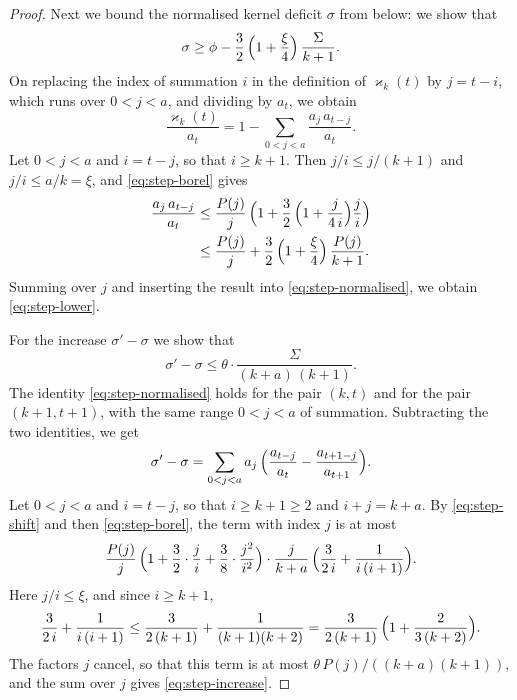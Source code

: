 \documentclass{amsart}
\theoremstyle{definition}
\theoremstyle{remark}
\numberwithin{equation}{section}
\begin{document}
\begin{proof}
Next we bound the normalised kernel deficit $\sigma$ from below: we show
that
\begin{equation}\label{eq:step-lower}
\sigma\ge\phi-\frac32\,\Bigl(1+\frac{\xi}{4}\Bigr)\,\frac{\Sigma}{k+1}.
\end{equation}
On replacing the index of summation $i$ in the definition of
$\varkappa_k(t)$ by $j=t-i$, which runs over $0<j<a$, and dividing by
$a_t$, we obtain
\begin{equation}\label{eq:step-normalised}
\frac{\varkappa_k(t)}{a_t}=1-\sum_{0<j<a}\frac{a_j\,a_{t-j}}{a_t}.
\end{equation}
Let $0<j<a$ and $i=t-j$, so that $i\ge k+1$. Then $j/i\le j/(k+1)$ and
$j/i\le a/k=\xi$, and \eqref{eq:step-borel} gives
\begin{align*}
\frac{a_j\,a_{t-j}}{a_t}
&\le\frac{P(j)}{j}\,
\Bigl(1+\frac32\,\Bigl(1+\frac{j}{4\,i}\Bigr)\frac{j}{i}\Bigr)\\
&\le\frac{P(j)}{j}+\frac32\,\Bigl(1+\frac{\xi}{4}\Bigr)\,\frac{P(j)}{k+1}.
\end{align*}
Summing over $j$ and inserting the result into \eqref{eq:step-normalised},
we obtain \eqref{eq:step-lower}.

For the increase $\sigma'-\sigma$ we show that
\begin{equation}\label{eq:step-increase}
\sigma'-\sigma\le\theta\cdot\frac{\Sigma}{(k+a)\,(k+1)}.
\end{equation}
The identity \eqref{eq:step-normalised} holds for the pair $(k,t)$ and for
the pair $(k+1,t+1)$, with the same range $0<j<a$ of summation. Subtracting
the two identities, we get
\[
\sigma'-\sigma=\sum_{0<j<a}a_j\,
\Bigl(\frac{a_{t-j}}{a_t}-\frac{a_{t+1-j}}{a_{t+1}}\Bigr).
\]
Let $0<j<a$ and $i=t-j$, so that $i\ge k+1\ge2$ and $i+j=k+a$. By
\eqref{eq:step-shift} and then \eqref{eq:step-borel}, the term with index
$j$ is at most
\[
\frac{P(j)}{j}\,
\Bigl(1+\frac32\cdot\frac{j}{i}+\frac38\cdot\frac{j^2}{i^2}\Bigr)\cdot
\frac{j}{k+a}\,\Bigl(\frac{3}{2\,i}+\frac{1}{i\,(i+1)}\Bigr).
\]
Here $j/i\le\xi$, and since $i\ge k+1$,
\[
\frac{3}{2\,i}+\frac{1}{i\,(i+1)}\le\frac{3}{2\,(k+1)}+\frac{1}{(k+1)(k+2)}
=\frac{3}{2\,(k+1)}\,\Bigl(1+\frac{2}{3\,(k+2)}\Bigr).
\]
The factors $j$ cancel, so that this term is at most
$\theta\,P(j)/((k+a)(k+1))$, and the sum over $j$ gives
\eqref{eq:step-increase}.


\end{proof}
\end{document}
